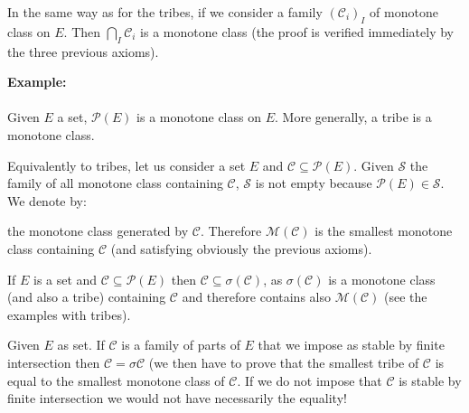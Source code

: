 	In the same way as for the tribes, if we consider a family $(\mathcal{C}_i)_I$ of monotone class on $E$. Then $\bigcap_I \mathcal{C}_i$ is a monotone class (the proof is verified immediately by the three previous axioms).
	\begin{tcolorbox}[colframe=black,colback=white,sharp corners]
	\textbf{{\Large {}}Example:}\\\\
	Given $E$ a set, $\mathcal{P}(E)$ is a monotone class on $E$. More generally, a tribe is a monotone class.

	Equivalently to tribes, let us consider a set $E$ and $\mathcal{C}\subseteq \mathcal{P}(E)$. Given $\mathcal{S}$ the family of all monotone class containing $\mathcal{C}$, $\mathcal{S}$ is not empty because $\mathcal{P}(E)\in \mathcal{S}$. We denote by:
	
	the monotone class generated by $\mathcal{C}$. Therefore $\mathcal{M}(\mathcal{C})$ is the smallest monotone class containing $\mathcal{C}$ (and satisfying obviously the previous axioms).
	\end{tcolorbox}
	\begin{tcolorbox}[title=Remark,colframe=black,arc=10pt]
	If $E$ is a set and $\mathcal{C}\subseteq \mathcal{P}(E)$ then $\mathcal{C}\subseteq \sigma(\mathcal{C})$, as $\sigma(\mathcal{C})$ is a monotone class (and also a tribe) containing $\mathcal{C}$ and therefore contains also $\mathcal{M}(\mathcal{C})$ (see the examples with tribes).
	\end{tcolorbox}	
	 \begin{theorem}
	Given $E$ as set. If $\mathcal{C}$ is a family of parts of $E$ that we impose as stable by finite intersection then $\mathcal{C}=\sigma{\mathcal{C}}$ (we then have to prove that the smallest tribe of $\mathcal{C}$ is equal to the smallest monotone class of $\mathcal{C}$. If we do not impose that $\mathcal{C}$ is stable by finite intersection we would not have necessarily the equality!
	\end{theorem}
